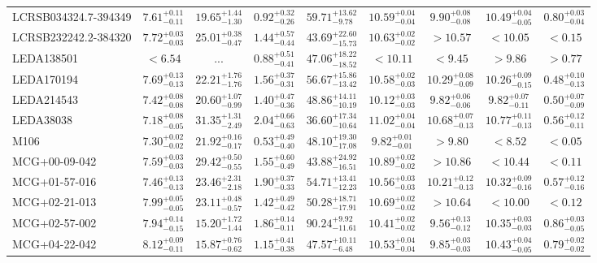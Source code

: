 \documentclass[onecolumn]{mn2e}
\begin{document}
{\begin{center}
\begin{longtable}{lcccccccc}
LCRSB034324.7-394349 & $7.61_{-0.11}^{+0.11}$ & $19.65_{-1.30}^{+1.44}$ & $0.92_{-0.26}^{+0.32}$ &$59.71_{-9.78}^{+13.62}$ & $10.59_{-0.04}^{+0.04}$ & $9.90_{-0.08}^{+0.08}$ & $10.49_{-0.05}^{+0.04}$ & $0.80_{-0.04}^{+0.03}$ \\
LCRSB232242.2-384320 & $7.72_{-0.03}^{+0.03}$ & $25.01_{-0.47}^{+0.38}$ & $1.44_{-0.44}^{+0.57}$ &$43.69_{-15.73}^{+22.60}$ & $10.63_{-0.02}^{+0.02}$ & $>10.57$ & $<10.05$ & $<0.15$ \\
LEDA138501 & $<6.54$ & ... & $0.88_{-0.41}^{+0.51}$ &$47.06_{-18.52}^{+18.22}$ & $<10.11$ & $<9.45$ & $>9.86$ & $>0.77$ \\
LEDA170194 & $7.69_{-0.13}^{+0.13}$ & $22.21_{-1.76}^{+1.76}$ & $1.56_{-0.31}^{+0.37}$ &$56.67_{-13.42}^{+15.86}$ & $10.58_{-0.03}^{+0.02}$ & $10.29_{-0.09}^{+0.08}$ & $10.26_{-0.15}^{+0.09}$ & $0.48_{-0.13}^{+0.10}$ \\
LEDA214543 & $7.42_{-0.08}^{+0.08}$ & $20.60_{-0.99}^{+1.07}$ & $1.40_{-0.36}^{+0.47}$ &$48.86_{-10.19}^{+14.11}$ & $10.12_{-0.03}^{+0.03}$ & $9.82_{-0.06}^{+0.06}$ & $9.82_{-0.11}^{+0.07}$ & $0.50_{-0.09}^{+0.07}$ \\
LEDA38038 & $7.18_{-0.05}^{+0.08}$ & $31.35_{-2.49}^{+1.31}$ & $2.04_{-0.63}^{+0.66}$ &$36.60_{-10.64}^{+17.34}$ & $11.02_{-0.04}^{+0.04}$ & $10.68_{-0.13}^{+0.07}$ & $10.77_{-0.13}^{+0.11}$ & $0.56_{-0.11}^{+0.12}$ \\
M106 & $7.30_{-0.02}^{+0.02}$ & $21.92_{-0.17}^{+0.16}$ & $0.53_{-0.40}^{+0.49}$ &$48.10_{-17.08}^{+19.30}$ & $9.82_{-0.01}^{+0.01}$ & $>9.80$ & $<8.52$ & $<0.05$ \\
MCG+00-09-042 & $7.59_{-0.03}^{+0.03}$ & $29.42_{-0.55}^{+0.50}$ & $1.55_{-0.49}^{+0.60}$ &$43.88_{-16.51}^{+24.92}$ & $10.89_{-0.02}^{+0.02}$ & $>10.86$ & $<10.44$ & $<0.11$ \\
MCG+01-57-016 & $7.46_{-0.13}^{+0.13}$ & $23.46_{-2.18}^{+2.31}$ & $1.90_{-0.33}^{+0.37}$ &$54.71_{-12.23}^{+13.41}$ & $10.56_{-0.03}^{+0.03}$ & $10.21_{-0.13}^{+0.12}$ & $10.32_{-0.16}^{+0.09}$ & $0.57_{-0.16}^{+0.12}$ \\
MCG+02-21-013 & $7.99_{-0.05}^{+0.05}$ & $23.11_{-0.57}^{+0.48}$ & $1.42_{-0.42}^{+0.49}$ &$50.28_{-17.91}^{+18.71}$ & $10.69_{-0.02}^{+0.02}$ & $>10.64$ & $<10.00$ & $<0.12$ \\
MCG+02-57-002 & $7.94_{-0.15}^{+0.14}$ & $15.20_{-1.44}^{+1.72}$ & $1.86_{-0.11}^{+0.14}$ &$90.24_{-11.61}^{+9.92}$ & $10.41_{-0.02}^{+0.02}$ & $9.56_{-0.12}^{+0.13}$ & $10.35_{-0.03}^{+0.03}$ & $0.86_{-0.05}^{+0.03}$ \\
MCG+04-22-042 & $8.12_{-0.11}^{+0.09}$ & $15.87_{-0.62}^{+0.76}$ & $1.15_{-0.38}^{+0.41}$ &$47.57_{-6.48}^{+10.11}$ & $10.53_{-0.04}^{+0.04}$ & $9.85_{-0.03}^{+0.03}$ & $10.43_{-0.05}^{+0.04}$ & $0.79_{-0.02}^{+0.02}$ \\

\end{longtable}
\end{center}}
\end{document}
